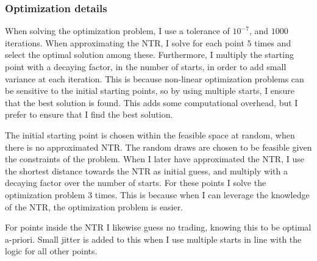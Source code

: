 \documentclass[11pt]{article}
\begin{document}
\subsubsection{Optimization details} \label{Subsubsection: optimization_details}
When solving the optimization problem, I use a tolerance of $10^{-7}$, and $1000$ iterations.
When approximating the \ac{NTR}, I solve for each point $5$ times and select the optimal solution among these.
Furthermore, I multiply the starting point with a decaying factor, in the number of starts,
in order to add small variance at each iteration. This is because non-linear optimization problems can be
sensitive to the initial starting points, so by using multiple starts, I ensure that the best solution is found.
This adds some computational overhead, but I prefer to ensure that I find the best solution.

The initial starting point is chosen within the feasible space at random, when there is no approximated \ac{NTR}.
The random draws are chosen to be feasible given the constraints of the problem.
When I later have approximated the \ac{NTR}, I use the shortest distance towards the \ac{NTR} as initial guess,
and multiply with a decaying factor over the number of starts. For these points I solve the optimization problem $3$ times.
This is because when I can leverage the knowledge of the \ac{NTR}, the optimization problem is easier.

For points inside the \ac{NTR} I likewise guess no trading, knowing this to be optimal a-priori.
Small jitter is added to this when I use multiple starts in line with the logic for all other points.

\ifdefined\COMPILINGMAIN
\else
\end{document}
